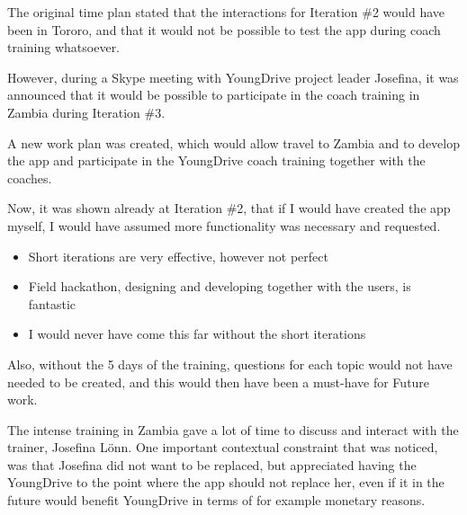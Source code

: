   The original time plan stated that the interactions for Iteration \#2 would have been in Tororo, and that it would not be possible to test the app during coach training whatsoever.


  However, during a Skype meeting with YoungDrive project leader Josefina, it was announced that it would be possible to participate in the coach training in Zambia during Iteration \#3.

  A new work plan was created, which would allow travel to Zambia and to develop the app and participate in the YoungDrive coach training together with the coaches.

  Now, it was shown already at Iteration \#2, that if I would have created the app myself, I would have assumed more functionality was necessary and requested.

  \begin{itemize}
  \item Short iterations are very effective, however not perfect
  \item Field hackathon, designing and developing together with the users, is fantastic
  \item I would never have come this far without the short iterations
  \end{itemize}

  Also, without the 5 days of the training, questions for each topic would not have needed to be created, and this would then have been a must-have for Future work. %

  The intense training in Zambia gave a lot of time to discuss and interact with the trainer, Josefina Lönn. One important contextual constraint that was noticed, was that Josefina did not want to be replaced, but appreciated having the YoungDrive to the point where the app should not replace her, even if it in the future would benefit YoungDrive in terms of for example monetary reasons.

